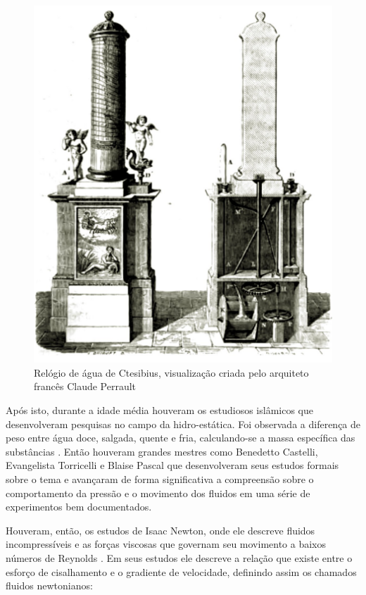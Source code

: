 \begin{figure}[htb]
	\begin{center}
    \includegraphics[scale=0.07]{ctesibius.jpeg}
	\end{center}
	\caption{\label{image:ctesibius} Relógio de água de Ctesibius, visualização criada pelo arquiteto francês Claude Perrault}
\end{figure}

Após isto, durante a idade média houveram os estudiosos islâmicos que desenvolveram pesquisas no campo da hidro-estática. Foi observada a diferença de peso entre água doce, salgada, quente e fria, calculando-se a massa específica das substâncias \cite{history_engeneering}. Então houveram grandes mestres como Benedetto Castelli, Evangelista Torricelli e Blaise Pascal que desenvolveram seus estudos formais sobre o tema e avançaram de forma significativa a compreensão sobre o comportamento da pressão e o movimento dos fluidos em uma série de experimentos bem documentados.

Houveram, então, os estudos de Isaac Newton, onde ele descreve fluidos incompressíveis e as forças viscosas que governam seu movimento a baixos números de Reynolds \cite{aristeu}. Em seus estudos ele descreve a relação que existe entre o esforço de cisalhamento e o gradiente de velocidade, definindo assim os chamados fluidos newtonianos:

